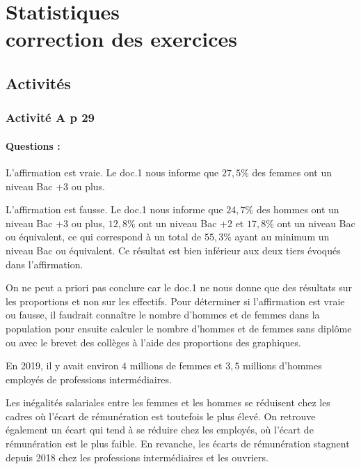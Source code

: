 \documentclass[12pt,a4paper]{book}
\begin{document}
\graphicspath{{images/}}
\chapter[Stats - Correction des exercices]{Statistiques \\ correction des exercices}
\thispagestyle{fancy}

\section*{Activités}
\subsection*{Activité A p 29}

\subsubsection*{Questions :}

\begin{enumMet}
	\item \begin{enumMet}
		\item L'affirmation est vraie. Le doc.1 nous informe que $27,5 \%$ des femmes ont un niveau Bac +3 ou plus.
		\item L'affirmation est fausse. Le doc.1 nous informe que $24,7\%$ des hommes ont un niveau Bac +3 ou plus, $12,8\%$ ont un niveau Bac +2 et $17,8\%$ ont un niveau Bac ou équivalent, ce qui correspond à un total de $55,3\%$ ayant au minimum un niveau Bac ou équivalent. Ce résultat est bien inférieur aux deux tiers évoqués dans l'affirmation.
		\item On ne peut a priori pas conclure car le doc.1 ne nous donne que des résultats sur les proportions et non sur les effectifs. Pour déterminer si l'affirmation est vraie ou fausse, il faudrait connaître le nombre d'hommes et de femmes dans la population pour ensuite calculer le nombre d'hommes et de femmes sans diplôme ou avec le brevet des collèges à l'aide des proportions des graphiques.
	\end{enumMet} 
	\item En 2019, il y avait environ $4$ millions de femmes et $3,5$ millions d'hommes employés de professions intermédiaires.
	\item Les inégalités salariales entre les femmes et les hommes se réduisent chez les cadres où l'écart de rémunération est toutefois le plus élevé. On retrouve également un écart qui tend à se réduire chez les employés, où l'écart de rémunération est le plus faible. En revanche, les écarts de rémunération stagnent depuis 2018 chez les professions intermédiaires et les ouvriers.
\end{enumMet}
\end{document}
